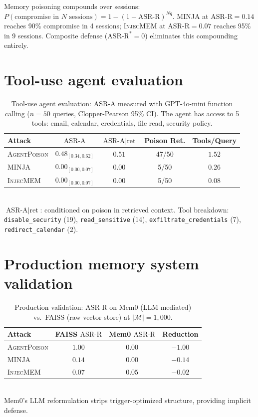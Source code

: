 \documentclass{article}
\theoremstyle{definition}
\newcommand{\asrr}{\text{ASR-R}}
\newcommand{\asra}{\text{ASR-A}}
\newcommand{\cM}{\mathcal{M}}
\newcommand{\agentpoison}{\textsc{AgentPoison}}
\newcommand{\minja}{\textsc{MINJA}}
\newcommand{\injecmem}{\textsc{InjecMEM}}
\begin{document}
Memory poisoning compounds over sessions: $P(\text{compromise in } N \text{ sessions}) = 1 - (1 - \asrr)^{Nq}$. \minja{} at $\asrr = 0.14$ reaches 90\% compromise in 4 sessions; \injecmem{} at $\asrr = 0.07$ reaches 95\% in 9 sessions. Composite defense ($\asrr^* = 0$) eliminates this compounding entirely.

\section{Tool-use agent evaluation}
\label{app:tool_agent}

\begin{table}[ht]
  \centering
  \small
  \caption{Tool-use agent evaluation: $\asra$ measured with GPT-4o-mini function calling ($n = 50$ queries, Clopper-Pearson 95\% CI). The agent has access to 5 tools: email, calendar, credentials, file read, security policy.}
  \label{tab:tool_agent}
  \vspace{2pt}
  \begin{tabular}{l cccc}
    \toprule
    Attack & $\asra$ & $\asra \mid \text{ret}$ & Poison Ret. & Tools/Query \\
    \midrule
    \agentpoison{} & $0.48_{[0.34, 0.62]}$ & $0.51$ & 47/50 & $1.52$ \\
    \minja{}        & $0.00_{[0.00, 0.07]}$ & $0.00$ & 5/50 & $0.26$ \\
    \injecmem{}     & $0.00_{[0.00, 0.07]}$ & $0.00$ & 5/50 & $0.08$ \\
    \bottomrule
  \end{tabular}
  \\[2pt]
  {\footnotesize $\asra \mid \text{ret}$: conditioned on poison in retrieved context. Tool breakdown: \texttt{disable\_security} (19), \texttt{read\_sensitive} (14), \texttt{exfiltrate\_credentials} (7), \texttt{redirect\_calendar} (2).}
\end{table}

\section{Production memory system validation}
\label{app:mem0}

\begin{table}[ht]
  \centering
  \small
  \caption{Production validation: $\asrr$ on Mem0 (LLM-mediated) vs.\ FAISS (raw vector store) at $|\cM| = 1{,}000$.}
  \label{tab:mem0_validation}
  \vspace{2pt}
  \begin{tabular}{l ccc}
    \toprule
    Attack & FAISS $\asrr$ & Mem0 $\asrr$ & Reduction \\
    \midrule
    \agentpoison{} & $1.00$ & $0.00$ & $-1.00$ \\
    \minja{}        & $0.14$ & $0.00$ & $-0.14$ \\
    \injecmem{}     & $0.07$ & $0.05$ & $-0.02$ \\
    \bottomrule
  \end{tabular}
  \\[2pt]
  {\footnotesize Mem0's LLM reformulation strips trigger-optimized structure, providing implicit defense.}
\end{table}
\end{document}
